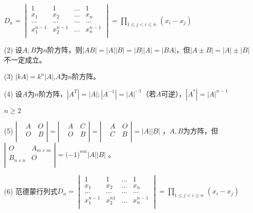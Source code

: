 $D_{n} = \begin{vmatrix} 1 & 1 & \ldots & 1 \\ x_{1} & x_{2} & \ldots & x_{n} \\ \ldots & \ldots & \ldots & \ldots \\ x_{1}^{n - 1} & x_{2}^{n - 1} & \ldots & x_{n}^{n - 1} \\ \end{vmatrix} = \prod_{1 \leq j < i \leq n}^{}\,(x_{i} - x_{j})$

(2) 设$A,B$为$n$阶方阵，则$\left| {AB} \right| = \left| A \right|\left| B \right| = \left| B \right|\left| A \right| = \left| {BA} \right|$，但$\left| A \pm B \right| = \left| A \right| \pm \left| B \right|$不一定成立。

(3) $\left| {kA} \right| = k^{n}\left| A \right|$,$A$为$n$阶方阵。

(4) 设$A$为$n$阶方阵，$|A^{T}| = |A|;|A^{- 1}| = |A|^{- 1}$（若$A$可逆），$|A^{*}| = |A|^{n - 1}$

$n \geq 2$

(5) $\left| \begin{matrix}  & {A\quad O} \\  & {O\quad B} \\ \end{matrix} \right| = \left| \begin{matrix}  & {A\quad C} \\  & {O\quad B} \\ \end{matrix} \right| = \left| \begin{matrix}  & {A\quad O} \\  & {C\quad B} \\ \end{matrix} \right| =| A||B|$
，$A,B$为方阵，但$\left| \begin{matrix} {O} & A_{m \times m} \\  B_{n \times n} & { O} \\ \end{matrix} \right| = ({- 1)}^{{mn}}|A||B|$ 。

(6) 范德蒙行列式$D_{n} = \begin{vmatrix} 1 & 1 & \ldots & 1 \\ x_{1} & x_{2} & \ldots & x_{n} \\ \ldots & \ldots & \ldots & \ldots \\ x_{1}^{n - 1} & x_{2}^{n 1} & \ldots & x_{n}^{n - 1} \\ \end{vmatrix} =  \prod_{1 \leq j < i \leq n}^{}\,(x_{i} - x_{j})$

